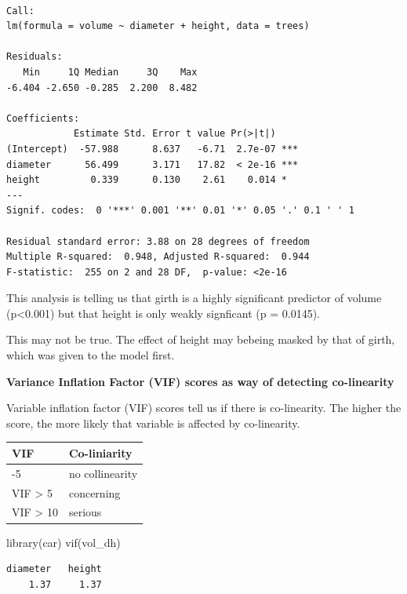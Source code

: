 \documentclass[
  letterpaper,
  DIV=11,
  numbers=noendperiod]{scrreprt}
\newenvironment{Shaded}{\begin{snugshade}}{\end{snugshade}}
\newcommand{\FunctionTok}[1]{\textcolor[rgb]{0.28,0.35,0.67}{#1}}
\newcommand{\NormalTok}[1]{\textcolor[rgb]{0.00,0.23,0.31}{#1}}
\begin{document}
\begin{verbatim}

Call:
lm(formula = volume ~ diameter + height, data = trees)

Residuals:
   Min     1Q Median     3Q    Max 
-6.404 -2.650 -0.285  2.200  8.482 

Coefficients:
            Estimate Std. Error t value Pr(>|t|)    
(Intercept)  -57.988      8.637   -6.71  2.7e-07 ***
diameter      56.499      3.171   17.82  < 2e-16 ***
height         0.339      0.130    2.61    0.014 *  
---
Signif. codes:  0 '***' 0.001 '**' 0.01 '*' 0.05 '.' 0.1 ' ' 1

Residual standard error: 3.88 on 28 degrees of freedom
Multiple R-squared:  0.948, Adjusted R-squared:  0.944 
F-statistic:  255 on 2 and 28 DF,  p-value: <2e-16
\end{verbatim}

This analysis is telling us that girth is a highly significant predictor
of volume (p\textless0.001) but that height is only weakly signficant (p
= 0.0145).

This may not be true. The effect of height may bebeing masked by that of
girth, which was given to the model first.

\textbf{Variance Inflation Factor (VIF) scores as way of detecting
co-linearity}

Variable inflation factor (VIF) scores tell us if there is co-linearity.
The higher the score, the more likely that variable is affected by
co-linearity.

\begin{longtable}[]{@{}ll@{}}
\toprule\noalign{}
VIF & Co-liniarity \\
\midrule\noalign{}
\endhead
\bottomrule\noalign{}
\endlastfoot
1 -5 & no collinearity \\
VIF \textgreater{} 5 & concerning \\
VIF \textgreater{} 10 & serious \\
\end{longtable}

\begin{Shaded}
\begin{Highlighting}[]
\FunctionTok{library}\NormalTok{(car)}
\FunctionTok{vif}\NormalTok{(vol\_dh)}
\end{Highlighting}
\end{Shaded}

\begin{verbatim}
diameter   height 
    1.37     1.37 
\end{verbatim}
\end{document}
